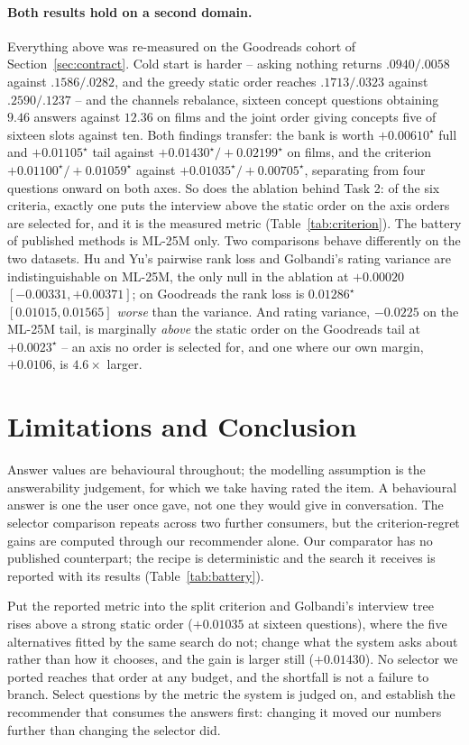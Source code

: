 \documentclass[runningheads]{llncs}
\begin{document}
\paragraph{Both results hold on a second domain.}
Everything above was re-measured on the Goodreads cohort of
Section~\ref{sec:contract}. Cold start is harder -- asking nothing returns $.0940/.0058$ against
$.1586/.0282$, and the greedy static order reaches $.1713/.0323$ against $.2590/.1237$ -- and the
channels rebalance, sixteen concept questions obtaining $9.46$ answers against $12.36$ on films and
the joint order giving concepts five of sixteen slots against ten. Both findings transfer: the bank is
worth $+0.00610^\star$ full and $+0.01105^\star$ tail against $+0.01430^\star/+0.02199^\star$ on
films, and the criterion $+0.01100^\star/+0.01059^\star$ against $+0.01035^\star/+0.00705^\star$,
separating from four questions onward on both axes. So does the ablation behind Task 2: of
the six criteria, exactly one puts the interview above the static order on the axis orders are
selected for, and it is the measured metric (Table~\ref{tab:criterion}). The battery of published
methods is ML-25M only. Two comparisons behave differently on the two datasets. Hu and Yu's pairwise
rank loss and Golbandi's rating variance are indistinguishable on ML-25M, the only null in the
ablation at $+0.00020$ $[-0.00331,+0.00371]$; on Goodreads the rank loss is $0.01286^\star$
$[0.01015,0.01565]$ \emph{worse} than the variance. And rating variance, $-0.0225$ on the ML-25M
tail, is marginally \emph{above} the static order on the Goodreads tail at $+0.0023^\star$ -- an axis
no order is selected for, and one where our own margin, $+0.0106$, is $4.6\times$ larger.


\section{Limitations and Conclusion}
\label{sec:limits}

Answer values are behavioural throughout; the modelling assumption is the answerability judgement,
for which we take having rated the item. A behavioural answer is one the user once gave, not one they
would give in conversation. The selector comparison repeats across two further consumers, but the
criterion-regret gains are computed through our recommender alone. Our comparator has no published
counterpart; the recipe is deterministic and the search it receives is reported with its results
(Table~\ref{tab:battery}).

\smallskip\noindent
Put the reported metric into the split criterion and Golbandi's interview tree rises above a strong
static order ($+0.01035$ at sixteen questions), where the five alternatives fitted by the same
search do not; change what the system asks about rather than how it chooses, and the gain is larger
still ($+0.01430$). No selector we ported reaches that order at any budget, and the shortfall
is not a failure to branch. Select questions by the metric the system is judged on, and establish the
recommender that consumes the answers first: changing it moved our numbers further than changing the
selector did.



\end{document}
